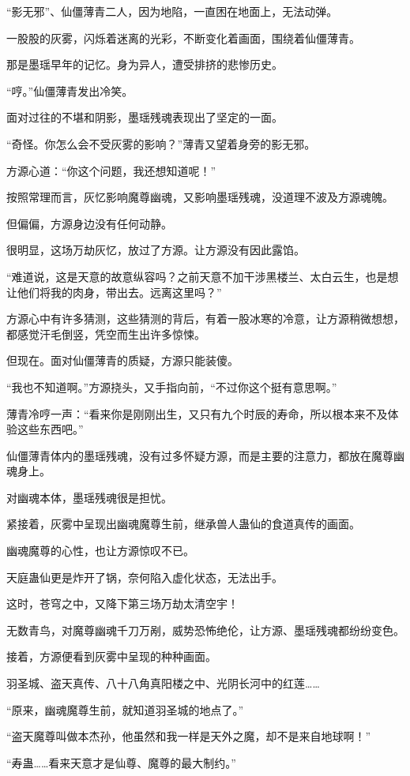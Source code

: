 \begin{this_body}
“影无邪”、仙僵薄青二人，因为地陷，一直困在地面上，无法动弹。

一股股的灰雾，闪烁着迷离的光彩，不断变化着画面，围绕着仙僵薄青。

那是墨瑶早年的记忆。身为异人，遭受排挤的悲惨历史。

“哼。”仙僵薄青发出冷笑。

面对过往的不堪和阴影，墨瑶残魂表现出了坚定的一面。

“奇怪。你怎么会不受灰雾的影响？”薄青又望着身旁的影无邪。

方源心道：“你这个问题，我还想知道呢！”

按照常理而言，灰忆影响魔尊幽魂，又影响墨瑶残魂，没道理不波及方源魂魄。

但偏偏，方源身边没有任何动静。

很明显，这场万劫灰忆，放过了方源。让方源没有因此露馅。

“难道说，这是天意的故意纵容吗？之前天意不加干涉黑楼兰、太白云生，也是想让他们将我的肉身，带出去。远离这里吗？”

方源心中有许多猜测，这些猜测的背后，有着一股冰寒的冷意，让方源稍微想想，都感觉汗毛倒竖，凭空而生出许多惊悚。

但现在。面对仙僵薄青的质疑，方源只能装傻。

“我也不知道啊。”方源挠头，又手指向前，“不过你这个挺有意思啊。”

薄青冷哼一声：“看来你是刚刚出生，又只有九个时辰的寿命，所以根本来不及体验这些东西吧。”

仙僵薄青体内的墨瑶残魂，没有过多怀疑方源，而是主要的注意力，都放在魔尊幽魂身上。

对幽魂本体，墨瑶残魂很是担忧。

紧接着，灰雾中呈现出幽魂魔尊生前，继承兽人蛊仙的食道真传的画面。

幽魂魔尊的心性，也让方源惊叹不已。

天庭蛊仙更是炸开了锅，奈何陷入虚化状态，无法出手。

这时，苍穹之中，又降下第三场万劫太清空宇！

无数青鸟，对魔尊幽魂千刀万剐，威势恐怖绝伦，让方源、墨瑶残魂都纷纷变色。

接着，方源便看到灰雾中呈现的种种画面。

羽圣城、盗天真传、八十八角真阳楼之中、光阴长河中的红莲……

“原来，幽魂魔尊生前，就知道羽圣城的地点了。”

“盗天魔尊叫做本杰孙，他虽然和我一样是天外之魔，却不是来自地球啊！”

“寿蛊……看来天意才是仙尊、魔尊的最大制约。”


\end{this_body}
